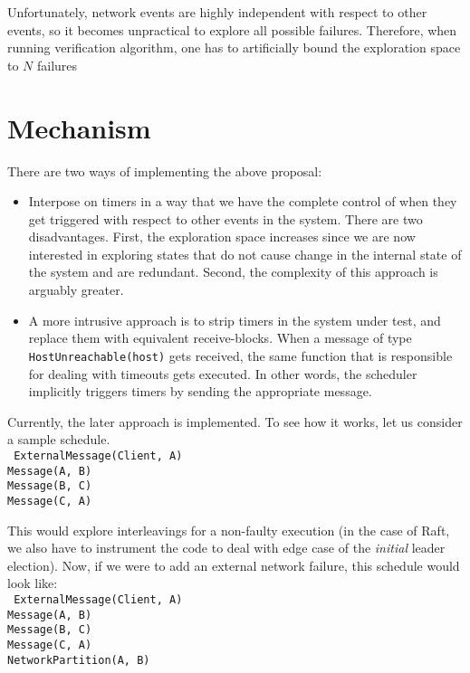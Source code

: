 \documentclass[DIV=calc, paper=a4, fontsize=11pt, twocolumn]{scrartcl}   %
\begin{document}
Unfortunately, network events are highly independent with respect to other events, so it becomes unpractical to explore all possible failures.  Therefore, when running verification algorithm, one has to artificially bound the exploration space to $N$ failures


\section*{Mechanism}

There are two ways of implementing the above proposal:

\begin{itemize}

\item Interpose on timers in a way that we have the complete control of when they get triggered with respect to other events in the system.  There are two disadvantages.  First, the exploration space increases since we are now interested in exploring states that do not cause change in the internal state of the system and are redundant.  Second, the complexity of this approach is arguably greater.

\item A more intrusive approach is to strip timers in the system under test, and replace them with equivalent receive-blocks.  When a message of type {\tt HostUnreachable(host)} gets received, the same function that is responsible for dealing with timeouts gets executed.  In other words, the scheduler implicitly triggers timers by sending the appropriate message.

\end{itemize}

Currently, the later approach is implemented.  To see how it works, let us consider a sample schedule.\\

\noindent
{\tt
ExternalMessage(Client, A)\\
Message(A, B)\\
Message(B, C)\\
Message(C, A)\\
}

This would explore interleavings for a non-faulty execution (in the case of Raft, we also have to instrument the code to deal with edge case of the {\em  initial} leader election).  Now, if we were to add an external network failure, this schedule would look like:\\

\noindent
{\tt
ExternalMessage(Client, A)\\
Message(A, B)\\
Message(B, C)\\
Message(C, A)\\
NetworkPartition(A, B)\\
}
\end{document}
